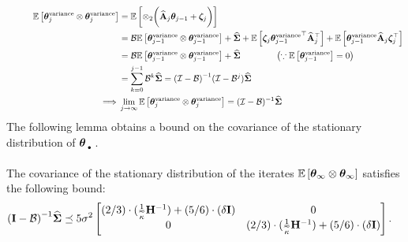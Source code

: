 \begin{align*}
\qquad \quad \E{\thetat[j]^{\textrm{variance}}\otimes \thetat[j]^{\textrm{variance}}} &=\E{\otimes_2 \bigg(\Ahatj\thetat[j-1]+\zetat[j]\bigg)}\\ \qquad \quad &= \BT \E{\thetat[j-1]^{\textrm{variance}}\otimes \thetat[j-1]^{\textrm{variance}}} + \Sigh + \E{\zetat {\thetat[j-1]^{\textrm{variance}}}\T {\Ahatj}\T} + \E{{\thetat[j-1]^{\textrm{variance}}} {\Ahatj} \zetat \T}\\\qquad \quad &= \BT \E{\thetat[j-1]^{\textrm{variance}}\otimes \thetat[j-1]^{\textrm{variance}}} + \Sigh\quad\quad\quad\quad \left(\because \E{\thetat[j-1]^{\textrm{variance}}}=\zero \right) \\&= \sum_{k=0}^{j-1} \BT^k \Sigh= \inv{\left(\eyeT-\B\right)}(\eyeT-\BT^j)\Sigh\\
\implies &\lim_{j\to\infty}\E{\thetat[j]^{\textrm{variance}}\otimes \thetat[j]^{\textrm{variance}}}=(\eyeT-\BT)^{-1}\Sigh
\end{align*}
The following lemma obtains a bound on the covariance of the stationary distribution of $\thetav_{\Bigcdot}$. 
\begin{lemma}\label{lem:main-variance}
	The covariance of the stationary distribution of the iterates $\E{\thetav_{\infty}\otimes\thetav_{\infty}}$ satisfies the following bound:
	\begin{align*}
	\inv{\left(\Id - \B\right)} \Sighat %
	&\preceq 5\sigma^2\begin{bmatrix} (2/3)\cdot (\frac{1}{\cnS}\Hinv)+ (5/6) \cdot(\delta\eye) & 0 \\ 0 & (2/3)\cdot (\frac{1}{\cnS}\Hinv)+ (5/6) \cdot(\delta\eye)\end{bmatrix}.
	\end{align*}
\end{lemma}
\fi